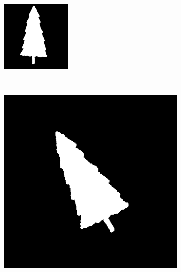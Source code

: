 \documentclass[
	article,			%
	11pt,				%
	oneside,			%
	a4paper,			%
	english,			%
	brazil,				%
	sumario=tradicional
	]{abntex2}
\begin{document}
\begin{figure}
		\centering
        \begin{subfigure}[b]{0.3\textwidth}
                \includegraphics[width=\textwidth]{imagens/ex1/imageScale1.png}
                \caption{}
                \label{fig:RotOriginal}
        \end{subfigure}%
        ~ %
        \begin{subfigure}[b]{0.3\textwidth}
                \includegraphics[width=\textwidth]{imagens/ex1/image30.png}
				\caption{}
                \label{fig:rot1}


\end{subfigure}
\end{figure}
\end{document}
